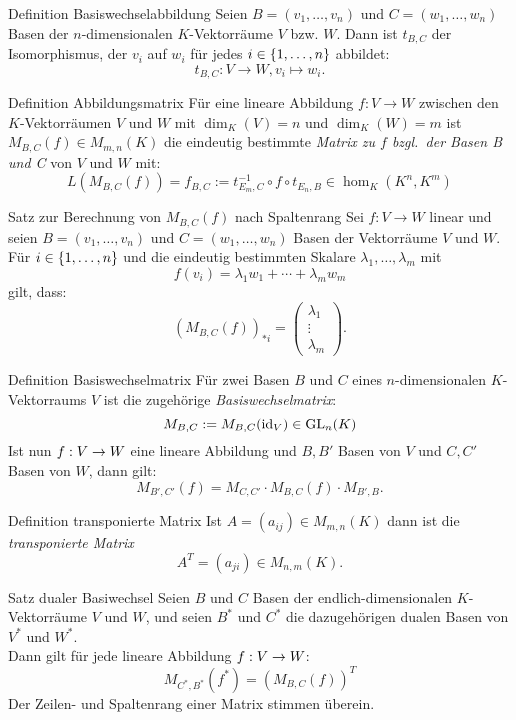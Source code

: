 \documentclass[main.tex]{subfiles}
\begin{document}
\begin{karte}{Definition Basiswechselabbildung}
    Seien \(B = (v_1, \ldots , v_n)\) und \(C = (w_1, \ldots , w_n)\)
    Basen der \(n\)-dimensionalen \(K\)-Vektorräume \(V\) bzw. \(W\).
    Dann ist \(t_{B,C}\) der Isomorphismus, der \(v_i\) auf \(w_i\) für 
    jedes \(i \in \{1, \ldots,n\}\) abbildet: 
    \[ t_{B,C}: V \rightarrow W, v_i \mapsto w_i. \]
\end{karte}
\begin{karte}{Definition Abbildungsmatrix}
    Für eine lineare Abbildung \(f:V \rightarrow W\) zwischen den
    \(K\)-Vektorräumen \(V\) und \(W\) mit \(\dim_K(V) = n\) und 
    \(\dim_K(W) = m\) ist \(M_{B,C}(f) \in M_{m,n}(K)\) die 
    eindeutig bestimmte \textit{Matrix zu \(f\) bzgl.\ der Basen 
    B und C} von \(V\) und \(W\) mit: 
    \[ L(M_{B,C}(f)) = f_{B,C} := t_{E_m,C}^{-1} \circ f \circ t_{E_n,B} 
    \in \hom_K(K^n,K^m)\] 
\end{karte}
\begin{karte}{Satz zur Berechnung von \(M_{B,C}(f)\) nach Spaltenrang}
    Sei \(f: V \rightarrow W\) linear und seien \(B = (v_1, \ldots ,v_n)\)
    und \(C = (w_1, \ldots , w_n)\) Basen der Vektorräume \(V\) und \(W\).
    Für \(i \in \{1,\ldots,n\}\) und die eindeutig bestimmten Skalare
    \(\lambda_1,\ldots,\lambda_m\) mit
    \[f(v_i) = \lambda_1w_1 + \cdots + \lambda_m w_m\]
    gilt, dass: 
    \[{(M_{B,C}(f))}_{*i} = 
    \begin{pmatrix}
        \lambda_1 \\
        \vdots \\
        \lambda_m
    \end{pmatrix}.\]
\end{karte}
\begin{karte}{Definition Basiswechselmatrix}
    Für zwei Basen \(B\) und \(C\) eines \(n\)-dimensionalen 
    \(K\)-Vektorraums \(V\) ist die zugehörige 
    \textit{Basiswechselmatrix}:
    \[M_{B,C} := M_{B,C}(\operatorname{id}_V) \in \operatorname{GL}_n(K) \]
    Ist nun \( f : V \rightarrow W \) eine lineare Abbildung und 
    \(B,B'\) Basen von \(V\) und \(C,C'\) Basen von \(W\), dann gilt:
    \[ M_{B',C'}(f) = M_{C,C'} \cdot M_{B,C}(f) \cdot M_{B',B}. \]
\end{karte}
\begin{karte}{Definition transponierte Matrix}
    Ist \(A = (a_{ij}) \in M_{m,n}(K)\) dann ist die \textit{transponierte Matrix}
    \[ A^T  = (a_{ji}) \in M_{n,m}(K). \]
\end{karte}
\begin{karte}{Satz dualer Basiwechsel}
    Seien \(B\) und \(C\) Basen der endlich-dimensionalen 
    \(K\)-Vektorräume \(V\) und \(W\), und seien \(B^*\) und \(C^*\)
    die dazugehörigen dualen Basen von \(V^*\) und \(W^*\).\\
    Dann gilt für jede lineare Abbildung \( f : V \rightarrow W \):
    \[M_{C^*,B^*}(f^*) = {(M_{B,C}(f))}^T\]
    Der Zeilen- und Spaltenrang einer Matrix stimmen überein.
\end{karte}
\end{document}
